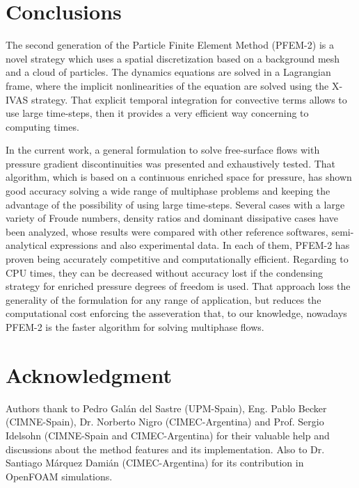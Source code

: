 \documentclass[review]{elsarticle}
\begin{document}





% 


\section{Conclusions}

The second generation of the Particle Finite Element Method (PFEM-2) is a novel strategy which uses a spatial discretization based on a background mesh and a cloud of particles. The dynamics equations are solved in a Lagrangian frame, where the implicit nonlinearities of the equation are solved using the {X-IVAS} strategy. That explicit temporal integration for convective terms allows to use large time-steps, then it provides a very efficient way concerning to computing times.

In the current work, a general formulation to solve free-surface flows with pressure gradient discontinuities was presented and exhaustively tested. That algorithm, which is based on a continuous enriched space for pressure, has shown good accuracy solving a wide range of multiphase problems and keeping the advantage of the possibility of using large time-steps. Several cases with a large variety of Froude numbers, density ratios and dominant dissipative cases have been analyzed, whose results were compared with other reference softwares, semi-analytical expressions and also experimental data. In each of them, PFEM-2 has proven being accurately competitive and computationally efficient. Regarding to CPU times, they can be decreased without accuracy lost if the condensing strategy for enriched pressure degrees of freedom is used. That approach loss the generality of the formulation for any range of application, but reduces the computational cost enforcing the asseveration that, to our knowledge, nowadays PFEM-2 is the faster algorithm for solving multiphase flows.

\section*{Acknowledgment}

Authors thank to Pedro Gal\'an del Sastre (UPM-Spain), Eng. Pablo Becker (CIMNE-Spain), Dr. Norberto Nigro (CIMEC-Argentina) and Prof. Sergio Idelsohn (CIMNE-Spain and CIMEC-Argentina) for their valuable help and discussions about the method features and its implementation. Also to Dr. Santiago M\'arquez Dami\'an (CIMEC-Argentina) for its contribution in OpenFOAM simulations.
\end{document}
